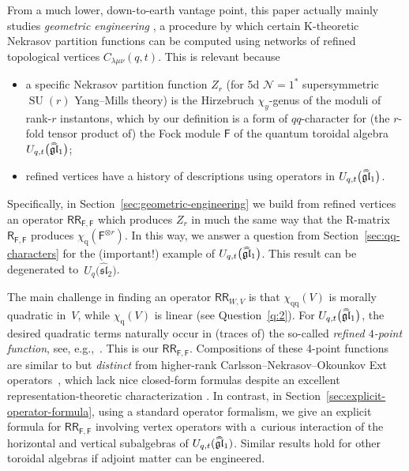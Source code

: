 \documentclass[pdftex]{sigma}%
\numberwithin{equation}{section}
\renewcommand{\hat}[1]{\widehat{#1}}
\newcommand{\hhat}[1]{\hat{\vphantom{\rule{1pt}{5.5pt}}\smash{\hat{#1}}}}
\newcommand{\lie}[1]{\mathfrak{#1}}
\newcommand{\cN}{\mathcal{N}}
\newcommand{\sF}{\mathsf{F}}
\newcommand{\sR}{\mathsf{R}}
\newcommand{\sRR}{\mathsf{RR}}
\newcommand{\chiq}{\chi_{\mathrm{q}}}
\newcommand{\chiqq}{\chi_{\mathrm{qq}}}
\DeclareMathOperator{\SU}{SU}
\begin{document}
From a much lower, down-to-earth vantage point, this paper actually
mainly studies {\it geometric engineering} \cite{Iqbal2006, Katz1997},
a procedure by which certain K-theoretic Nekrasov partition functions
can be computed using networks of refined topological vertices
$C_{\lambda\mu\nu}(q,t)$. This is relevant because
\begin{itemize}\itemsep=0pt
\item a specific Nekrasov partition function $Z_r$ (for 5d $\cN=1^*$
 supersymmetric $\SU(r)$ Yang--Mills theory) is the Hirzebruch
 $\chi_y$-genus of the moduli of rank-$r$ instantons, which by our
 definition is a form of $qq$-character for (the $r$-fold tensor
 product of) the Fock module $\sF$ of the quantum toroidal algebra
 $U_{q,t}\big(\hhat{\lie{gl}}_1\big)$;
\item refined vertices have a history of descriptions \cite{Awata2012,
 Iqbal2010} using operators in $U_{q,t}\big(\hhat{\lie{gl}}_1\big)$.
\end{itemize}
Specifically, in Section~\ref{sec:geometric-engineering} we build from
refined vertices an operator $\sRR_{\sF,\sF}$ which produces $Z_r$ in
much the same way that the R-matrix $\sR_{\sF,\sF}$ produces
$\chiq(\sF^{\otimes r})$. In this way, we answer a question from
Section~\ref{sec:qq-characters} for the (important!) example of
$U_{q,t}\big(\hhat{\lie{gl}}_1\big)$. This result can be degenerated to~$U_q\big(\hat{\lie{sl}}_2\big)$.

The main challenge in finding an operator $\sRR_{W,V}$ is that
$\chiqq(V)$ is morally quadratic in~$V$, while $\chiq(V)$ is linear
(see Question~\ref{q:2}). For $U_{q,t}\big(\hhat{\lie{gl}}_1\big)$, the
desired quadratic terms naturally occur in (traces of) the so-called
{\it refined $4$-point function}, see, e.g.,~\cite{Awata2016}. This is our
$\sRR_{\sF,\sF}$. Compositions of these 4-point functions are similar
to but {\it distinct} from higher-rank Carlsson--Nekrasov--Okounkov
Ext operators~\cite{Carlsson2014}, which lack nice closed-form
formulas despite an excellent representation-theoretic
characterization \cite{Negut2017,Negut2020}. In contrast, in
Section~\ref{sec:explicit-operator-formula}, using a standard operator
formalism, we give an explicit formula for $\sRR_{\sF,\sF}$ involving
vertex operators with a~curious interaction of the horizontal and
vertical subalgebras of $U_{q,t}(\hhat{\lie{gl}}_1)$. Similar results
hold for other toroidal algebras if adjoint matter can be engineered.
\end{document}
